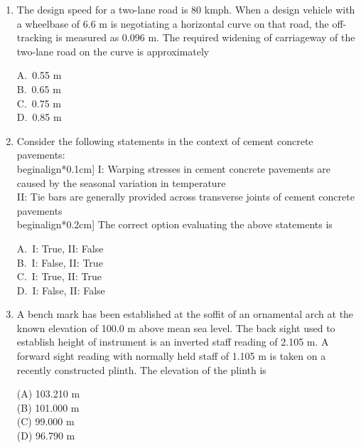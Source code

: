 \documentclass[journal,12pt,onecolumn]{exam}
\theoremstyle{remark}
\begin{document}
\begin{enumerate}
\noindent\item The design speed for a two-lane road is 80 kmph. When a design vehicle with a wheelbase of 6.6 m is negotiating a horizontal curve on that road, the off-tracking is measured as 0.096 m. The required widening of carriageway of the two-lane road on the curve is approximately
\\ \hfill{}
\begin{multicols}{4}
A.\ 0.55 m \\
B.\ 0.65 m \\
C.\ 0.75 m \\
D.\ 0.85 m
\end{multicols}

\noindent\item Consider the following statements in the context of cement concrete pavements: \\begin{align*}0.1cm]
I: Warping stresses in cement concrete pavements are caused by the seasonal variation in temperature \\ 
II: Tie bars are generally provided across transverse joints of cement concrete pavements \\begin{align*}0.2cm]
The correct option evaluating the above statements is
\hfill{}
\begin{multicols}{4}
A.\ I: True, II: False \\
B.\ I: False, II: True \\
C.\ I: True, II: True \\
D.\ I: False, II: False
\end{multicols}
\noindent\item A bench mark has been established at the soffit of an ornamental arch at the known elevation of 100.0 m above mean sea level. The back sight used to establish height of instrument is an inverted staff reading of 2.105 m. A forward sight reading with normally held staff of 1.105 m is taken on a recently constructed plinth. The elevation of the plinth is

\setlength{\parskip}{0.5cm}

\hfill{}

\begin{multicols}{4}
\noindent(A) 103.210 m\\
(B) 101.000 m\\
(C) 99.000 m\\
(D) 96.790 m
\end{multicols}


\end{enumerate}
\end{document}

